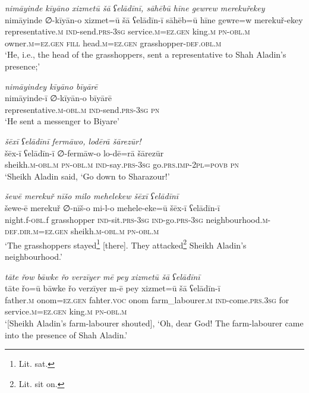 \ea \label{PM.6}
\textit{nimāyinde kīyāno xizmetū šā ʕelādīnī, sāhēbū hīne gewrew merekuřekey} \\ 
\gll nimāyinde ∅-kīyān-o xizmet=ū šā ʕelādīn-ī sāhēb=ū hīne gewre=w merekuř-ekey \\ 
 representative\textsc{.m} \textsc{ind-}send\textsc{.prs}\textsc{-3sg} service\textsc{.m}\textsc{\textsc{=ez.gen}} king\textsc{.m} \textsc{pn}\textsc{-obl}\textsc{.m} owner\textsc{.m}\textsc{\textsc{=ez.gen}} \textsc{fill} head\textsc{.m}\textsc{\textsc{=ez.gen}} grasshopper\textsc{-def}\textsc{.obl}\textsc{.m} \\ 
\glt `He, i.e., the head of the grasshoppers, sent a representative to Shah Aladin’s presence;'
\z 
 
\ea \label{PM.7}
\textit{nimāyindey kīyāno bīyārē} \\ 
\gll nimāyinde-ī ∅-kīyān-o bīyārē \\ 
 representative\textsc{.m}\textsc{-obl}\textsc{.m} \textsc{ind-}send\textsc{.prs}\textsc{-3sg} \textsc{pn} \\ 
\glt `He sent a messenger to Biyare'
\z 
 
\ea \label{PM.16}
\textit{šēxī ʕelādīnī fermāwo, lodērā šārezūr!} \\ 
\gll šēx-ī ʕelādīn-ī ∅-fermāw-o lo-dē=rā šārezūr \\ 
 sheikh\textsc{.m}\textsc{-obl}\textsc{.m} \textsc{pn}\textsc{-obl}\textsc{.m} \textsc{ind-}say\textsc{.prs}\textsc{-3sg} go\textsc{.prs}.\textsc{imp-}\textsc{2pl}\textsc{=\textsc{povb}} \textsc{pn} \\ 
\glt `Sheikh Aladin said, ‘Go down to Sharazour!'
\z 
 
\ea \label{PM.23}
\textit{šewē merekuř nīšo milo mehelekew šēxī ʕelādīnī} \\ 
\gll šewe-ē merekuř ∅-nīš-o mi-l-o mehele-eke=ū šēx-ī ʕelādīn-ī \\ 
 night.f\textsc{-obl}.f grasshopper \textsc{ind-}sit\textsc{.prs}\textsc{-3sg} \textsc{ind-}go\textsc{.prs}\textsc{-3sg} neighbourhood\textsc{.m}\textsc{-def}\textsc{.dir}\textsc{.m}\textsc{\textsc{=ez.gen}} sheikh\textsc{.m}\textsc{-obl}\textsc{.m} \textsc{pn}\textsc{-obl}\textsc{.m} \\ 
\glt `The grasshoppers stayed\footnote{Lit. sat.} [there]. They attacked\footnote{Lit. sit on.} Sheikh Aladin’s neighbourhood.'
\z 
 
\ea \label{PM.28}
\textit{tāte řow bāwke řo verzīyer mē pey xizmetū šā ʕelādīnī} \\ 
\gll tāte řo=ū bāwke řo verzīyer m-ē pey xizmet=ū šā ʕelādīn-ī \\ 
 father\textsc{.m} onom\textsc{\textsc{=ez.gen}} fahter.\textsc{voc} onom farm\_labourer\textsc{.m} \textsc{ind-}come\textsc{.prs}\textsc{.3sg} for service\textsc{.m}\textsc{\textsc{=ez.gen}} king\textsc{.m} \textsc{pn}\textsc{-obl}\textsc{.m} \\ 
\glt `[Sheikh Aladin’s farm-labourer shouted], ‘Oh, dear God! The farm-labourer came into the presence of Shah Aladin.'
\z 
 
